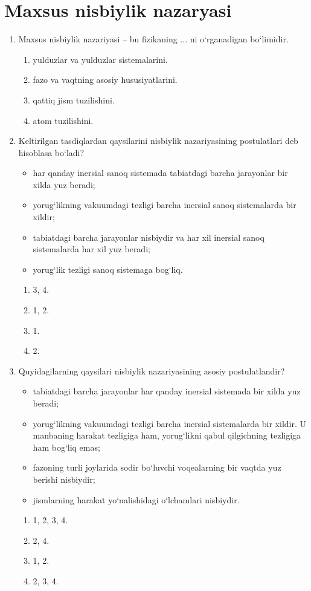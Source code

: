\section{Maxsus nisbiylik nazaryasi}



\begin{enumerate}

\item Maxsus nisbiylik nazariyasi -- bu fizikaning ... ni o‘rganadigan bo‘limidir.
\begin{enumerate}[label=\Alph*)]
\item yulduzlar va yulduzlar sistemalarini.
\item fazo va vaqtning asosiy hususiyatlarini.
\item qattiq jism tuzilishini.
\item atom tuzilishini.
\end{enumerate}

\item Keltirilgan tasdiqlardan qaysilarini nisbiylik nazariyasining postulatlari deb hisoblasa bo‘ladi?
\begin{itemize}
    \item[1)] har qanday inersial sanoq sistemada tabiatdagi barcha jarayonlar bir xilda yuz beradi;
    \item[2)] yorug‘likning vakuumdagi tezligi barcha inersial sanoq sistemalarda bir xildir;
    \item[3)] tabiatdagi barcha jarayonlar nisbiydir va har xil inersial sanoq sistemalarda har xil yuz beradi;
    \item[4)] yorug‘lik tezligi sanoq sistemaga bog‘liq.
\end{itemize}
\begin{enumerate}[label=\Alph*)]
\item 3, 4.
\item 1, 2.
\item 1.
\item 2.
\end{enumerate}

\item Quyidagilarning qaysilari nisbiylik nazariyasining asosiy postulatlandir?
\begin{itemize}
    \item[1)] tabiatdagi barcha jarayonlar har qanday inersial sistemada bir xilda yuz beradi;
    \item[2)] yorug‘likning vakuumdagi tezligi barcha inersial sistemalarda bir xildir. U manbaning harakat tezligiga ham, yorug‘likni qabul qilgichning tezligiga ham bog‘liq emas;
    \item[3)] fazoning turli joylarida sodir bo‘luvchi voqealarning bir vaqtda yuz berishi nisbiydir;
    \item[4)] jismlarning harakat yo‘nalishidagi o‘lchamlari nisbiydir.
\end{itemize}
\begin{enumerate}[label=\Alph*)]
\item 1, 2, 3, 4.
\item 2, 4.
\item 1, 2.
\item 2, 3, 4.
\end{enumerate}


\end{enumerate}
